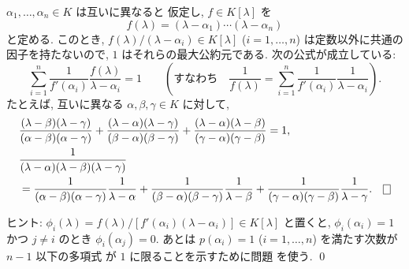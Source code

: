 \documentclass[12pt,twoside]{jarticle}
\begin{document}

\begin{question}
\label{q:Lagrange-interpolation-1}
  $\alpha_1,\dots,\alpha_n\in K$ は互いに異なると
  仮定し, $f\in K[\lambda]$ を
  \begin{equation*}
    f(\lambda)=(\lambda-\alpha_1)\cdots(\lambda-\alpha_n)
  \end{equation*}
  と定める.
  このとき, $f(\lambda)/(\lambda-\alpha_i)\in K[\lambda]$ ($i=1,\dots,n$) 
  は定数以外に共通の因子を持たないので, $1$ はそれらの最大公約元である. 
  次の公式が成立している:
  \begin{equation*}
    \sum_{i=1}^n 
    \frac{1}{f'(\alpha_i)}\frac{f(\lambda)}{\lambda-\alpha_i}
    = 1
    \qquad
    \left(
      \text{すなわち}\quad
      \frac{1}{f(\lambda)}
      = \sum_{i=1}^n 
      \frac{1}{f'(\alpha_i)}\frac{1}{\lambda-\alpha_i}
    \right).
  \end{equation*}
  たとえば, 互いに異なる $\alpha,\beta,\gamma\in K$ に対して,
  \begin{align*}
    &
    \frac{(\lambda-\beta)(\lambda-\gamma)}{(\alpha-\beta)(\alpha-\gamma)} +
    \frac{(\lambda-\alpha)(\lambda-\gamma)}{(\beta-\alpha)(\beta-\gamma)} +
    \frac{(\lambda-\alpha)(\lambda-\beta)}{(\gamma-\alpha)(\gamma-\beta)} 
    = 1,
    \\ &
    \frac{1}{(\lambda-\alpha)(\lambda-\beta)(\lambda-\gamma)}
    \\ &
    =
    \frac{1}{(\alpha-\beta)(\alpha-\gamma)}
    \frac{1}{\lambda-\alpha} +
    \frac{1}{(\beta-\alpha)(\beta-\gamma)}
    \frac{1}{\lambda-\beta} +
    \frac{1}{(\gamma-\alpha)(\gamma-\beta)}
    \frac{1}{\lambda-\gamma}.
    \qed
  \end{align*}
\end{question}

\noindent
ヒント: 
$\phi_i(\lambda)=f(\lambda)/[f'(\alpha_i)(\lambda-\alpha_i)]\in K[\lambda]$ 
と置くと, $\phi_i(\alpha_i)=1$ かつ $j\ne i$ のとき $\phi_i(\alpha_j)=0$.
あとは $p(\alpha_i)=1$ ($i=1,\dots,n$) を満たす次数が $n-1$ 以下の多項式
が $1$ に限ることを示すために問題  を使う.
\qed

\end{document}

